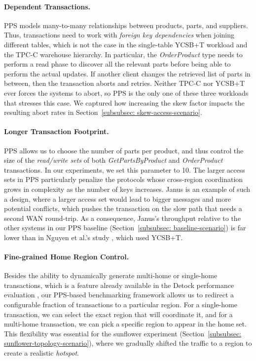 \documentclass{article}
\begin{document}
\paragraph{Dependent Transactions.}
PPS models many-to-many relationships between products, parts, and suppliers. Thus, transactions need to work with \textit{foreign key dependencies} when joining different tables, which is not the case in the single-table YCSB+T workload and the TPC-C warehouse hierarchy. In particular, the \textit{OrderProduct} type needs to perform a read phase to discover all the relevant parts before being able to perform the actual updates. If another client changes the retrieved list of parts in between, then the transaction aborts and retries. Neither TPC-C nor YCSB+T ever forces the systems to abort, so PPS is the only one of these three workloads that stresses this case. We captured how increasing the skew factor impacts the resulting abort rates in Section~\ref{subsubsec: skew-access-scenario}.

\paragraph{Longer Transaction Footprint.}
PPS allows us to choose the number of parts per product, and thus control the size of the \textit{read/write sets} of both \textit{GetPartsByProduct} and \textit{OrderProduct} transactions. In our experiments, we set this parameter to 10. The larger access sets in PPS particularly penalize the protocols whose cross-region coordination grows in complexity as the number of keys increases. Janus is an example of such a design, where a larger access set would lead to bigger messages and more potential conflicts, which pushes the transaction on the slow path that needs a second WAN round-trip. As a consequence, Janus's throughput relative to the other systems in our PPS baseline (Section~\ref{subsubsec: baseline-scenario}) is far lower than in Nguyen et al.'s study \cite{nguyen2023detock}, which used YCSB+T.

\paragraph{Fine-grained Home Region Control.}
Besides the ability to dynamically generate multi-home or single-home transactions, which is a feature already available in the Detock performance evaluation \cite{nguyen2023detock}, our PPS-based benchmarking framework allows us to redirect a configurable fraction of transactions to a particular region. For a single-home transaction, we can select the exact region that will coordinate it, and for a multi-home transaction, we can pick a specific region to appear in the home set. This flexibility was essential for the sunflower experiment (Section~\ref{subsubsec: sunflower-topology-scenario}), where we gradually shifted the traffic to a region to create a realistic \textit{hotspot}.
\end{document}
